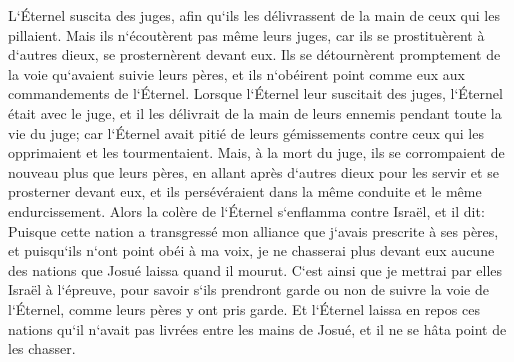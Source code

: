 \verse L`Éternel suscita des juges, afin qu`ils les délivrassent de la main de ceux qui les pillaient. 
\verse Mais ils n`écoutèrent pas même leurs juges, car ils se prostituèrent à d`autres dieux, se prosternèrent devant eux. Ils se détournèrent promptement de la voie qu`avaient suivie leurs pères, et ils n`obéirent point comme eux aux commandements de l`Éternel. 
\verse Lorsque l`Éternel leur suscitait des juges, l`Éternel était avec le juge, et il les délivrait de la main de leurs ennemis pendant toute la vie du juge; car l`Éternel avait pitié de leurs gémissements contre ceux qui les opprimaient et les tourmentaient. 
\verse Mais, à la mort du juge, ils se corrompaient de nouveau plus que leurs pères, en allant après d`autres dieux pour les servir et se prosterner devant eux, et ils persévéraient dans la même conduite et le même endurcissement. 
\verse Alors la colère de l`Éternel s`enflamma contre Israël, et il dit: Puisque cette nation a transgressé mon alliance que j`avais prescrite à ses pères, et puisqu`ils n`ont point obéi à ma voix, 
\verse je ne chasserai plus devant eux aucune des nations que Josué laissa quand il mourut. 
\verse C`est ainsi que je mettrai par elles Israël à l`épreuve, pour savoir s`ils prendront garde ou non de suivre la voie de l`Éternel, comme leurs pères y ont pris garde. 
\verse Et l`Éternel laissa en repos ces nations qu`il n`avait pas livrées entre les mains de Josué, et il ne se hâta point de les chasser. 

\chapter{}


